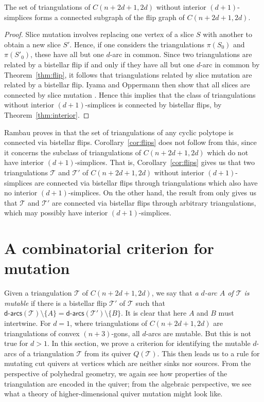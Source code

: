 \documentclass[ALCO,Unicode,published]{cedram}
\newcommand{\darcs}[1]{\mathsf{d}\text{-}\mathsf{arcs}(#1)} %
\begin{document}
\begin{coro}\label{cor:flips}
The set of triangulations of $C(n + 2d + 1, 2d)$ without interior $(d + 1)$-simplices forms a connected subgraph of the flip graph of $C(n + 2d + 1, 2d)$.
\end{coro}
\begin{proof}
Slice mutation involves replacing one vertex of a slice $S$ with another to obtain a new slice $S'$. Hence, if one considers the triangulations $\pi(S_{0})$ and $\pi(S'_{0})$, these have all but one $d$-arc in common. Since two triangulations are related by a bistellar flip if and only if they have all but one $d$-arc in common by Theorem~\ref{thm:flip}, it follows that triangulations related by slice mutation are related by a bistellar flip. Iyama and Oppermann then show that all slices are connected by slice mutation \cite[Theorem 5.27]{io}. Hence this implies that the class of  triangulations without interior $(d + 1)$-simplices is connected by bistellar flips, by Theorem~\ref{thm:interior}.
\end{proof}

\begin{rema}
Rambau proves in \cite{rambau} that the set of triangulations of any cyclic polytope is connected via bistellar flips. Corollary~\ref{cor:flips} does not follow from this, since it concerns the subclass of triangulations of $C(n + 2d + 1, 2d)$ which do not have interior $(d + 1)$-simplices. That is, Corollary~\ref{cor:flips} gives us that two triangulations $\mathcal{T}$ and $\mathcal{T}'$ of $C(n + 2d + 1, 2d)$ without interior $(d + 1)$-simplices are connected via bistellar flips through triangulations which also have no interior $(d + 1)$-simplices. On the other hand, the result from \cite{rambau} only gives us that $\mathcal{T}$ and $\mathcal{T}'$ are connected via bistellar flips through arbitrary triangulations, which may possibly have interior $(d + 1)$-simplices.
\end{rema}

\section{A combinatorial criterion for mutation}\label{sect:mut}

Given a triangulation $\mathcal{T}$ of $C(n + 2d + 1,2d)$, we say that \emph{a $d$-arc $A$ of $\mathcal{T}$ is mutable} if there is a bistellar flip $\mathcal{T}'$ of $\mathcal{T}$ such that $\darcs{\mathcal{T}} \setminus \{A\} = \darcs{\mathcal{T}'}\setminus \{B\}$. It is clear that here $A$ and $B$ must intertwine. For $d = 1$, where triangulations of $C(n + 2d + 1, 2d)$ are triangulations of convex $(n+3)$-gons, all $d$-arcs are mutable. But this is not true for $d > 1$. In this section, we prove a criterion for identifying the mutable $d$-arcs of a triangulation $\mathcal{T}$ from its quiver $Q(\mathcal{T})$. This then leads us to a rule for mutating cut quivers at vertices which are neither sinks nor sources. From the perspective of polyhedral geometry, we again see how properties of the triangulation are encoded in the quiver; from the algebraic perspective, we see what a theory of higher-dimensional quiver mutation might look like.
\end{document}

